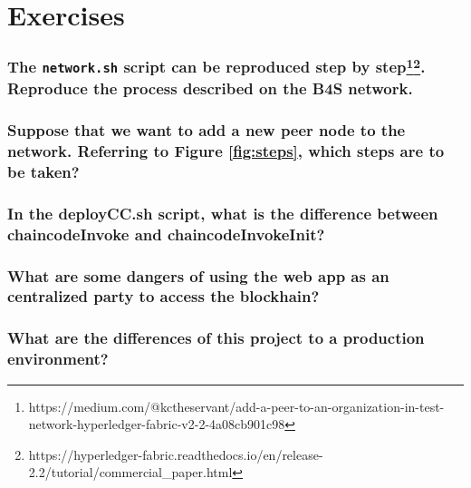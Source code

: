 \documentclass[12pt,a4paper]{article}
\theoremstyle{definition}
\begin{document}






%





\section{Exercises}



\subsubsection*{The \texttt{network.sh} script can be reproduced step by step\footnote{https://medium.com/@kctheservant/add-a-peer-to-an-organization-in-test-network-hyperledger-fabric-v2-2-4a08cb901c98}\footnote{https://hyperledger-fabric.readthedocs.io/en/release-2.2/tutorial/commercial\_paper.html}. Reproduce the process described on the B4S network.}

\subsubsection*{Suppose that we want to add a new peer node to the network. Referring to Figure \ref{fig:steps}, which steps are to be taken?}

\subsubsection*{In the deployCC.sh script, what is the difference between chaincodeInvoke and chaincodeInvokeInit?}

\subsubsection*{What are some dangers of using the web app as an centralized party to access the blockhain?}


\subsubsection*{What are the differences of this project to a production environment?}





\end{document}
